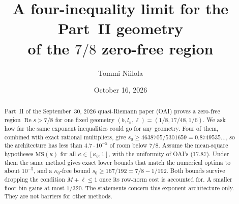\documentclass[11pt]{article}
\title{A four-inequality limit for the Part~II geometry\\ of the $7/8$ zero-free region}
\author{Tommi Niilola}
\date{October 16, 2026}
\theoremstyle{remark}\newtheorem*{remark}{Remark}
\begin{document}
\maketitle

\begin{abstract}
Part~II of the September~30, 2026 quasi-Riemann paper (OAI) proves a zero-free region
$\operatorname{Re}s>7/8$ for one fixed geometry $(b,l_x,\ell)=(1/8,17/48,1/6)$. We ask how far the
same exponent inequalities could go for any geometry. Four of them, combined with exact rational
multipliers, give $s_0\ge 4638705/5301659=0.8749535\ldots$, so the architecture has less than
$4.7\cdot10^{-5}$ of room below $7/8$. Assume the mean-square hypotheses $\mathrm{MS}(\kappa)$ for all
$\kappa\in[\kappa_0,1]$, with the uniformity of OAI's (17.87). Under them the same method gives exact lower bounds that match the numerical optima to about $10^{-5}$, and a
$\kappa_0$-free bound $s_0\ge 167/192=7/8-1/192$. Both bounds survive dropping the condition
$M+\ell\le1$ once its row-norm cost is accounted for. A smaller floor bin gains at most $1/320$. The statements concern this exponent
architecture only. They are not barriers for other methods.
\end{abstract}
\end{document}
